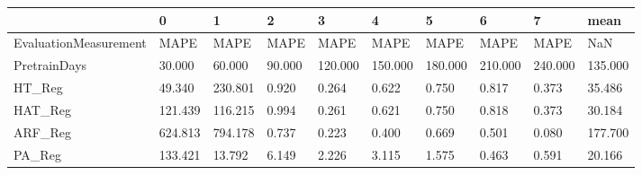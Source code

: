 \begin{tabular}{llllllllll}
\toprule
{} &       0 &       1 &      2 &       3 &       4 &       5 &       6 &       7 &    mean \\
\midrule
EvaluationMeasurement &    MAPE &    MAPE &   MAPE &    MAPE &    MAPE &    MAPE &    MAPE &    MAPE &     NaN \\
PretrainDays          &  30.000 &  60.000 & 90.000 & 120.000 & 150.000 & 180.000 & 210.000 & 240.000 & 135.000 \\
HT\_Reg                &  49.340 & 230.801 &  0.920 &   0.264 &   0.622 &   0.750 &   0.817 &   0.373 &  35.486 \\
HAT\_Reg               & 121.439 & 116.215 &  0.994 &   0.261 &   0.621 &   0.750 &   0.818 &   0.373 &  30.184 \\
ARF\_Reg               & 624.813 & 794.178 &  0.737 &   0.223 &   0.400 &   0.669 &   0.501 &   0.080 & 177.700 \\
PA\_Reg                & 133.421 &  13.792 &  6.149 &   2.226 &   3.115 &   1.575 &   0.463 &   0.591 &  20.166 \\
\bottomrule
\end{tabular}
